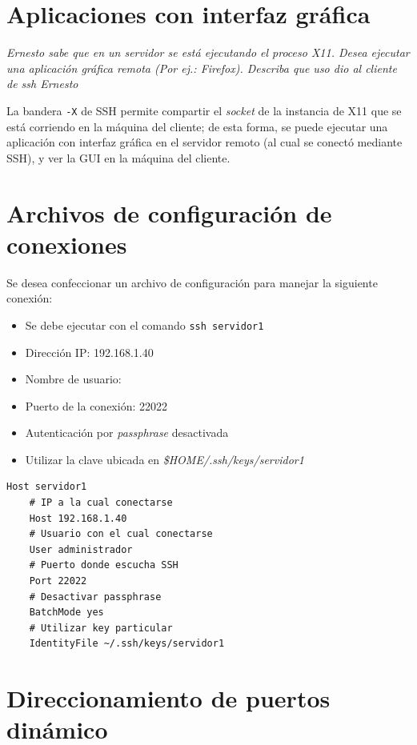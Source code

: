 \section{Aplicaciones con interfaz gráfica}

\emph{Ernesto sabe que en un servidor se está ejecutando el proceso X11. Desea ejecutar una aplicación gráfica remota (Por ej.: Firefox).  Describa que uso dio al cliente de ssh Ernesto}
\vspace*{5mm}

La bandera \texttt{-X} de SSH permite compartir el \emph{socket} de la instancia de X11 que se está corriendo en la máquina del cliente; de esta forma, se puede ejecutar una aplicación con interfaz gráfica en el servidor remoto (al cual se conectó mediante SSH), y ver la GUI en la máquina del cliente.  

\section{Archivos de configuración de conexiones}

Se desea confeccionar un archivo de configuración para manejar la siguiente conexión:

\begin{itemize}
    \item Se debe ejecutar con el comando \texttt{ssh servidor1} 
    \item Dirección IP: 192.168.1.40
    \item Nombre de usuario: 
    \item Puerto de la conexión: 22022
    \item Autenticación por \emph{passphrase} desactivada 
    \item Utilizar la clave ubicada en \emph{\$HOME/.ssh/keys/servidor1} 
\end{itemize}

\begin{lstlisting}
Host servidor1
    # IP a la cual conectarse
    Host 192.168.1.40
    # Usuario con el cual conectarse
    User administrador
    # Puerto donde escucha SSH
    Port 22022
    # Desactivar passphrase
    BatchMode yes
    # Utilizar key particular
    IdentityFile ~/.ssh/keys/servidor1
\end{lstlisting}


\section{Direccionamiento de puertos dinámico}

